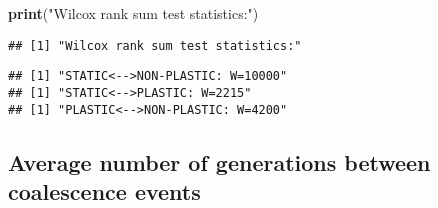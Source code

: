 \documentclass[]{book}
\newenvironment{Shaded}{\begin{snugshade}}{\end{snugshade}}
\newcommand{\ControlFlowTok}[1]{\textcolor[rgb]{0.13,0.29,0.53}{\textbf{#1}}}
\newcommand{\DataTypeTok}[1]{\textcolor[rgb]{0.13,0.29,0.53}{#1}}
\newcommand{\DecValTok}[1]{\textcolor[rgb]{0.00,0.00,0.81}{#1}}
\newcommand{\KeywordTok}[1]{\textcolor[rgb]{0.13,0.29,0.53}{\textbf{#1}}}
\newcommand{\NormalTok}[1]{#1}
\newcommand{\OperatorTok}[1]{\textcolor[rgb]{0.81,0.36,0.00}{\textbf{#1}}}
\newcommand{\OtherTok}[1]{\textcolor[rgb]{0.56,0.35,0.01}{#1}}
\newcommand{\StringTok}[1]{\textcolor[rgb]{0.31,0.60,0.02}{#1}}
\begin{document}
\begin{Shaded}
\begin{Highlighting}[]
\KeywordTok{print}\NormalTok{(}\StringTok{"Wilcox rank sum test statistics:"}\NormalTok{)}
\end{Highlighting}
\end{Shaded}

\begin{verbatim}
## [1] "Wilcox rank sum test statistics:"
\end{verbatim}

\begin{Shaded}
\end{Shaded}

\begin{verbatim}
## [1] "STATIC<-->NON-PLASTIC: W=10000"
## [1] "STATIC<-->PLASTIC: W=2215"
## [1] "PLASTIC<-->NON-PLASTIC: W=4200"
\end{verbatim}

\hypertarget{average-number-of-generations-between-coalescence-events}{%
\subsection{Average number of generations between coalescence events}\label{average-number-of-generations-between-coalescence-events}}
\end{document}
